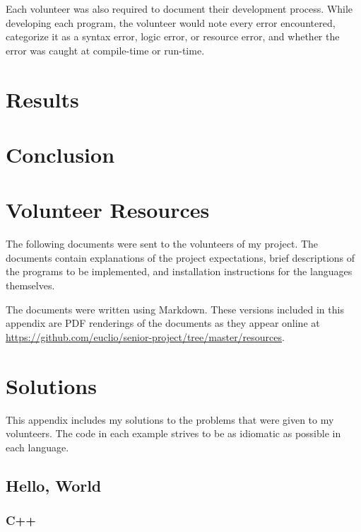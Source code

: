 \documentclass[draftcopy,nolof,nolot]{srpaper}
\begin{document}
Each volunteer was also required to document their development process. While
developing each program, the volunteer would note every error encountered,
categorize it as a syntax error, logic error, or resource error, and whether
the error was caught at compile-time or run-time.

\chapter{Results}

\chapter{Conclusion}

\nocite{*}


\appendix
\chapter{Volunteer Resources}\label{app:resources}
The following documents were sent to the volunteers of my project. The
documents contain explanations of the project expectations, brief descriptions
of the programs to be implemented, and installation instructions for the
languages themselves.

The documents were written using Markdown. These versions included in this
appendix are PDF renderings of the documents as they appear online at
\url{https://github.com/euclio/senior-project/tree/master/resources}.





\chapter{Solutions}\label{app:solutions}
This appendix includes my solutions to the problems that were given to my
volunteers. The code in each example strives to be as idiomatic as possible in
each language.


\section{Hello, World}
\subsection{C++}
\begin{mdframed}[linecolor=black]
\inputminted{cpp}{../examples/hello-world/hello_world.cpp}
\end{mdframed}
\end{document}

